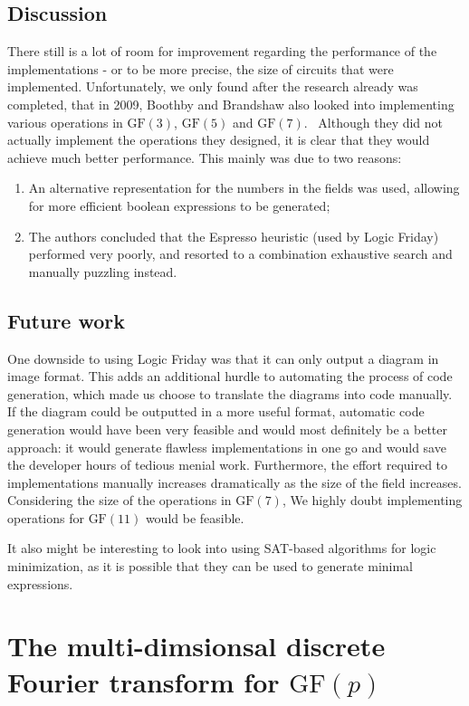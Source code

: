 \documentclass{report}
\newcommand{\GF}{\text{GF}}
\begin{document}
\section{Discussion}
There still is a lot of room for improvement regarding the performance of the implementations - or to be more precise, the size of circuits that were implemented. Unfortunately, we only found after the research already was completed, that in 2009, Boothby and Brandshaw also looked into implementing various operations in $\GF(3)$, $\GF(5)$ and $\GF(7)$.~\cite{boothby2009bitslicing} Although they did not actually implement the operations they designed, it is clear that they would achieve much better performance. This mainly was due to two reasons:
\begin{enumerate}
\item An alternative representation for the numbers in the fields was used, allowing for more efficient boolean expressions to be generated;
\item The authors concluded that the Espresso heuristic (used by Logic Friday) performed very poorly, and resorted to a combination exhaustive search and manually puzzling instead.
\end{enumerate} 


\section{Future work}
One downside to using Logic Friday was that it can only output a diagram in image format. This adds an additional hurdle to automating the process of code generation, which made us choose to translate the diagrams into code manually.
If the diagram could be outputted in a more useful format, automatic code generation would have been very feasible and would most definitely be a better approach:
it would generate flawless implementations in one go and would save the developer hours of tedious menial work. Furthermore, the effort required to implementations manually increases dramatically as the size of the field increases. Considering the size of the operations in $\GF(7)$, We highly doubt implementing operations for $\GF(11)$ would be feasible. 

It also might be interesting to look into using SAT-based algorithms for logic minimization, as it is possible that they can be used to generate minimal expressions.

\chapter{The multi-dimsionsal discrete Fourier transform for $\GF(p)$}
\end{document}
